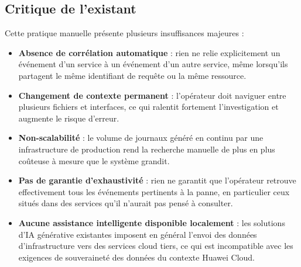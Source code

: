 \documentclass[a4paper,11pt,oneside]{report}
\begin{document}
\subsection{Critique de l'existant}
Cette pratique manuelle présente plusieurs insuffisances majeures :
\begin{itemize}
    \item \textbf{Absence de corrélation automatique} : rien ne relie explicitement un événement d'un service à un événement d'un autre service, même lorsqu'ils partagent le même identifiant de requête ou la même ressource.
    \item \textbf{Changement de contexte permanent} : l'opérateur doit naviguer entre plusieurs fichiers et interfaces, ce qui ralentit fortement l'investigation et augmente le risque d'erreur.
    \item \textbf{Non-scalabilité} : le volume de journaux généré en continu par une infrastructure de production rend la recherche manuelle de plus en plus coûteuse à mesure que le système grandit.
    \item \textbf{Pas de garantie d'exhaustivité} : rien ne garantit que l'opérateur retrouve effectivement tous les événements pertinents à la panne, en particulier ceux situés dans des services qu'il n'aurait pas pensé à consulter.
    \item \textbf{Aucune assistance intelligente disponible localement} : les solutions d'IA générative existantes imposent en général l'envoi des données d'infrastructure vers des services cloud tiers, ce qui est incompatible avec les exigences de souveraineté des données du contexte Huawei Cloud.
\end{itemize}
\end{document}
